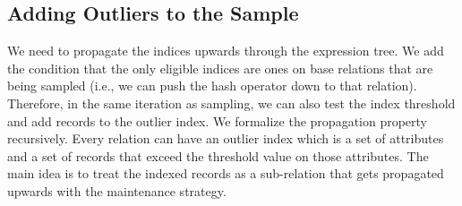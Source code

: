 
\subsection{Adding Outliers to the Sample}
We need to propagate the indices upwards through the expression tree.
We add the condition that the only eligible indices are ones on base relations that are being sampled (i.e., we can push the hash operator down to that relation).
Therefore, in the same iteration as sampling, we can also test the index threshold and add records to the outlier index. 
We formalize the propagation property recursively. 
Every relation can have an outlier index which is a set of attributes and a set of records that exceed the threshold value on those attributes.
The main idea is to treat the indexed records as a sub-relation that gets propagated upwards with the maintenance strategy.
